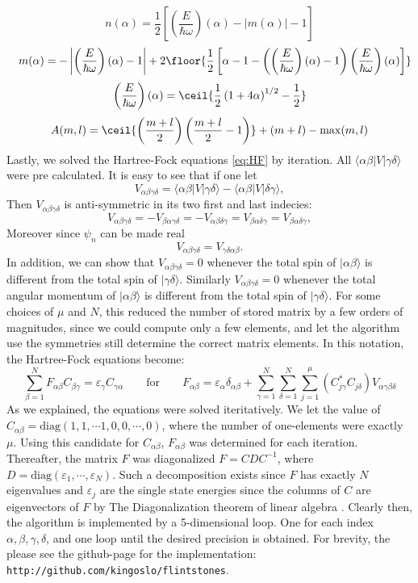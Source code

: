\documentclass[11pt,english,a4paper]{article}
\begin{document}
\[
n(\alpha) = \frac{1}{2} \left[ \left(\frac{E}{\hbar \omega} \right)(\alpha) - |m(\alpha)| - 1 \right]\]
\[ \quad m(\alpha) = - \left| \left(\frac{E}{\hbar \omega} \right)(\alpha) - 1 \right| + 2 \floor{ \frac{1}{2}\left[\alpha - 1 - \left( \left(\frac{E}{\hbar \omega} \right)(\alpha) - 1 \right)\left(\frac{E}{\hbar \omega} \right)(\alpha) \right] }
\]
\[
\left(\frac{E}{\hbar \omega} \right)(\alpha) = \ceil{\frac{1}{2}\left( 1 + 4\alpha \right)^{1/2} - \frac{1}{2} }
\]
\[
A(m,l) = \ceil{ \left( \frac{m+l}{2} \right)\left( \frac{m+l}{2} -1 \right) } + (m+l) - \max(m,l)
\]
Lastly, we solved the Hartree-Fock equations \ref{eq:HF} by iteration. All $\langle \alpha \beta | V  |  \gamma \delta \rangle$ were pre calculated. It is easy to see that if one let 
\[
V_{  \alpha \beta \gamma \delta} = \langle \alpha \beta | V  |  \gamma \delta \rangle - \langle \alpha \beta | V  |  \delta \gamma \rangle,
\]
Then $V_{  \alpha \beta \gamma \delta}$ is anti-symmetric in its two first and last indecies:
\[
V_{  \alpha \beta \gamma \delta} = -V_{  \beta\alpha  \gamma \delta} = -V_{  \alpha \beta \delta \gamma } = V_{  \beta \alpha \delta\gamma } = V_{  \beta \alpha \delta\gamma },
\]
Moreover since $\psi_n$ can be made real
\[
V_{  \alpha \beta \gamma \delta} = V_{  \gamma \delta\alpha \beta}.
\]
In addition, we can show that $V_{  \alpha \beta \gamma \delta} = 0$ whenever the total spin of $ |  \alpha \beta \rangle $ is different from the total spin of $ |  \gamma  \delta \rangle $. Similarly $V_{  \alpha \beta \gamma \delta} = 0$ whenever the total angular momentum of $ |  \alpha \beta \rangle $ is different from the total spin of $ |  \gamma  \delta \rangle$. For some choices of $\mu$ and $N$, this reduced the number of stored matrix by a few orders of magnitudes, since we could compute only a few elements, and let the algorithm use the symmetries still determine the correct matrix elements. In this notation, the Hartree-Fock equations become:
\[
\sum_{  \beta = 1}^N F_{  \alpha \beta} C_{  \beta \gamma} = \varepsilon_\gamma C_{  \gamma \alpha} \qquad \text{for} \qquad F_{  \alpha \beta} = \varepsilon_{  \alpha} \delta_{  \alpha \beta} + \sum_{  \gamma = 1}^N \sum_{  \delta = 1}^N \sum_{  j=1}^\mu \left( C_{  j \gamma}^* C_{  j \delta} \right)V_{  \alpha \gamma \beta \delta}
\]
As we explained, the equations were solved iteritatively. We let the value of $C_{  \alpha \beta} = \text{diag}(1,1,\cdots 1,0,0,\cdots,0)$, where the number of one-elements were exactly $\mu$. Using this candidate for $C_{  \alpha \beta}$, $F_{  \alpha \beta}$ was determined for each iteration. Thereafter, the matrix $F$ was diagonalized $F = CDC^{  -1}$, where $D = \text{diag} ( \varepsilon_1, \cdots, \varepsilon_N)$. Such a decomposition exists since $F$ has exactly $N$ eigenvalues and $\varepsilon_j$ are the single state energies since the columns of $C$ are eigenvectors of $F$ by The Diagonalization theorem of linear algebra \parencite[282]{lay_linear_2012}. Clearly then, the algorithm is implemented by a 5-dimensional loop. One for each index $\alpha, \beta, \gamma, \delta$, and one loop until the desired precision is obtained. For brevity, the please see the github-page for the implementation: \texttt{http://github.com/kingoslo/flintstones}.\\
\end{document}
